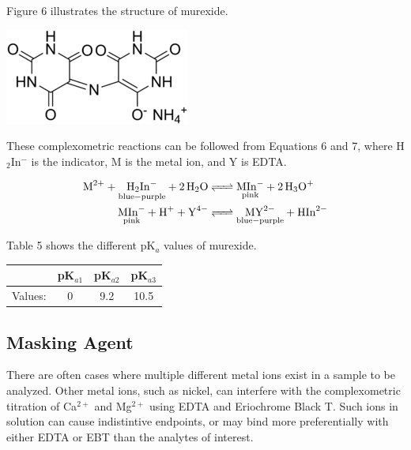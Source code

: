 \documentclass{article}
\begin{document}
Figure 6 illustrates the structure of murexide.\cite{murexide}
\begin{center}
        \includegraphics[scale=0.8]{murexide}
\end{center}

These complexometric reactions can be followed from Equations 6 and 7, where H$_2$In$^-$ is the
indicator, M is the metal ion, and Y is EDTA.
\begin{center} 
\begin{align}
        \ce {M^2+ + $\underset{\mathrm{blue-purple}}{\ce{H_2In^-}}$ + 2H2O 
        &<=> $\underset{\mathrm{pink}}{\ce{MIn^-}}$ + 2H3O^+}\\ 
        \ce {$\underset{\mathrm{pink}}{\ce{MIn-}}$ + H^+ + Y^4- 
        &<=> $\underset{\mathrm{blue-purple}}{\ce{MY^2-}}$ + HIn^2-} 
\end{align} 
\end{center}

Table 5 shows the different pK$_a$ values of murexide. \cite{dojindo}
\begin{center}
        \begin{tabular}{|c|c|c|c|}
                \hline
                & pK$_{a1}$ & pK$_{a2}$ & pK$_{a3}$ \\
                \hline
                Values: & 0 & 9.2 & 10.5 \\
                \hline
        \end{tabular}
\end{center}


\subsection {Masking Agent}
There are often cases where multiple different metal ions exist in a sample to
be analyzed. Other metal ions, such as nickel, can interfere with the
complexometric titration of Ca$^{2+}$ and Mg$^{2+}$ using EDTA and Eriochrome
Black T. Such ions in solution can cause indistintive endpoints, or may bind
more preferentially with either EDTA or EBT than the analytes of interest.
\end{document}
